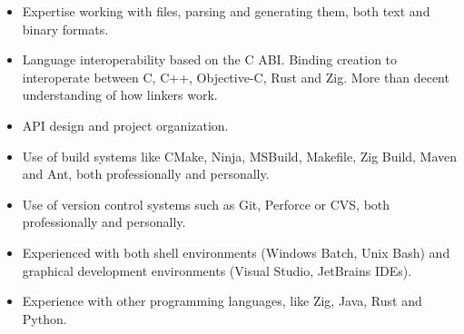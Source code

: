 \begin{itemize}
	\item Expertise working with files, parsing and generating them, both text and binary formats.
	
	\item Language interoperability based on the C ABI. Binding creation to interoperate between C, C++, Objective-C, Rust and Zig. More than decent understanding of how linkers work.
	
	\item API design and project organization.
	
	\item Use of build systems like CMake, Ninja, MSBuild, Makefile, Zig Build, Maven and Ant, both professionally and personally.
	
	\item Use of version control systems such as Git, Perforce or CVS, both professionally and personally.
	
	\item Experienced with both shell environments (Windows Batch, Unix Bash) and graphical development environments (Visual Studio, JetBrains IDEs).
	
	\item Experience with other programming languages, like Zig, Java, Rust and Python.
\end{itemize}